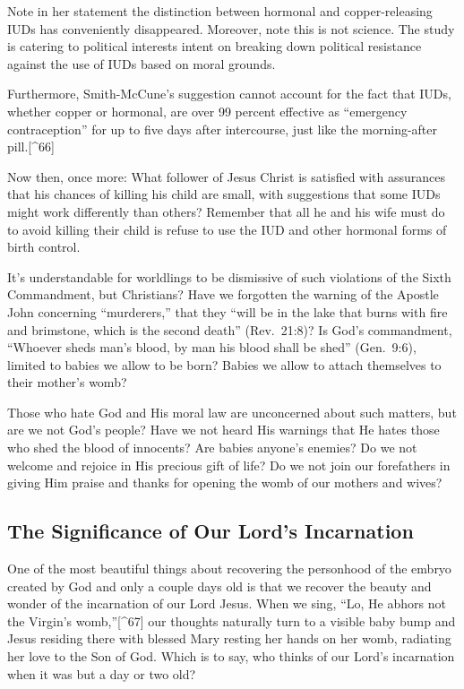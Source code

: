 \documentclass[
]{book}
\begin{document}
Note in her statement the distinction between hormonal and copper-releasing IUDs has conveniently disappeared. Moreover, note this is not science. The study is catering to political interests intent on breaking down political resistance against the use of IUDs based on moral grounds.

Furthermore, Smith-McCune's suggestion cannot account for the fact that IUDs, whether copper or hormonal, are over 99 percent effective as ``emergency contraception'' for up to five days after intercourse, just like the morning-after pill.{[}\^{}66{]}

Now then, once more: What follower of Jesus Christ is satisfied with assurances that his chances of killing his child are small, with suggestions that some IUDs might work differently than others? Remember that all he and his wife must do to avoid killing their child is refuse to use the IUD and other hormonal forms of birth control.

It's understandable for worldlings to be dismissive of such violations of the Sixth Commandment, but Christians? Have we forgotten the warning of the Apostle John concerning ``murderers,'' that they ``will be in the lake that burns with fire and brimstone, which is the second death'' (Rev.~21:8)? Is God's commandment, ``Whoever sheds man's blood, by man his blood shall be shed'' (Gen.~9:6), limited to babies we allow to be born? Babies we allow to attach themselves to their mother's womb?

Those who hate God and His moral law are unconcerned about such matters, but are we not God's people? Have we not heard His warnings that He hates those who shed the blood of innocents? Are babies anyone's enemies? Do we not welcome and rejoice in His precious gift of life? Do we not join our forefathers in giving Him praise and thanks for opening the womb of our mothers and wives?

\hypertarget{the-significance-of-our-lords-incarnation}{%
\subsection{The Significance of Our Lord's Incarnation}\label{the-significance-of-our-lords-incarnation}}

One of the most beautiful things about recovering the personhood of the embryo created by God and only a couple days old is that we recover the beauty and wonder of the incarnation of our Lord Jesus. When we sing, ``Lo, He abhors not the Virgin's womb,''{[}\^{}67{]} our thoughts naturally turn to a visible baby bump and Jesus residing there with blessed Mary resting her hands on her womb, radiating her love to the Son of God. Which is to say, who thinks of our Lord's incarnation when it was but a day or two old?
\end{document}
